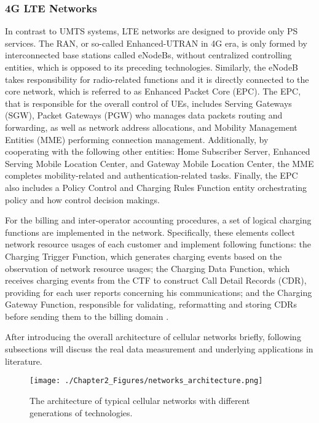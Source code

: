 \subsubsection*{4G LTE Networks}
In contrast to UMTS systems, LTE networks are designed to provide only PS services. The RAN, or so-called Enhanced-UTRAN in 4G era, is only formed by interconnected base stations called eNodeBs, without centralized controlling entities, which is opposed to its preceding technologies. Similarly, the eNodeB takes responsibility for radio-related functions and it is directly connected to the core network, which is referred to as Enhanced Packet Core (EPC). The EPC, that is responsible for the overall control of UEs, includes Serving Gateways (SGW), Packet Gateways (PGW) who manages data packets routing and forwarding, as well as network address allocations, and Mobility Management Entities (MME) performing connection management. Additionally, by cooperating with the following other entities: Home Subscriber Server, Enhanced Serving Mobile Location Center, and Gateway Mobile Location Center, the MME completes mobility-related and authentication-related tasks. Finally, the EPC also includes a Policy Control and Charging Rules Function entity orchestrating policy and how control decision makings.

For the billing and inter-operator accounting procedures, a set of logical charging functions are implemented in the network. Specifically, these elements collect network resource usages of each customer and implement following functions: the Charging Trigger Function, which generates charging events based on the observation of network resource usages; the Charging Data Function, which receives charging events from the CTF to construct Call Detail Records (CDR), providing for each user reports concerning his communications; and the Charging Gateway Function, responsible for validating, reformatting and storing CDRs before sending them to the billing domain \cite{rappaport1996wireless}.

After introducing the overall architecture of cellular networks briefly, following subsections will discuss the real data measurement and underlying applications in literature.

\begin{figure}[!htb]
\centering
\texttt{[image: ./Chapter2\_Figures/networks\_architecture.png]}
\centering
\caption{The architecture of typical cellular networks with different generations of technologies.}
\label{networks_architecture}
\end{figure}

